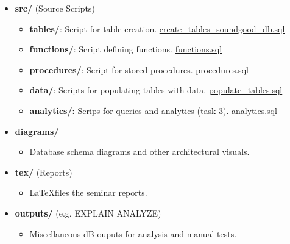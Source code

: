 \documentclass[a4paper]{scrartcl}
\begin{document}
\begin{itemize}
    \item \textbf{src/} (Source Scripts)
    \begin{itemize}
        \item \textbf{tables/}: Script for table creation.
        \href{https://github.com/VincentFerrigan/kth-iv1351-data-storage-paradigms/blob/main/src/tables/create_tables_soundgood_db.sql}{create\_tables\_soundgood\_db.sql}
        \item \textbf{functions/}: Script defining functions.
        \href{https://github.com/VincentFerrigan/kth-iv1351-data-storage-paradigms/blob/main/src/functions/functions.sql}{functions.sql}
        \item \textbf{procedures/}: Script for stored procedures.
        \href{https://github.com/VincentFerrigan/kth-iv1351-data-storage-paradigms/blob/main/src/procedures/procedures.sql}{procedures.sql}
        \item \textbf{data/}: Scripts for populating tables with data.
        \href{https://github.com/VincentFerrigan/kth-iv1351-data-storage-paradigms/blob/main/src/data/populate_tables.sql}{populate\_tables.sql}
        \item \textbf{analytics/:} Scrips for queries and analytics (task 3).
        \href{https://github.com/VincentFerrigan/kth-iv1351-data-storage-paradigms/blob/main/src/analytics/analytics.sql}{analytics.sql}
    \end{itemize}

    \item \textbf{diagrams/}
    \begin{itemize}
        \item Database schema diagrams and other architectural visuals.
    \end{itemize}

    \item \textbf{tex/} (Reports)
    \begin{itemize}
        \item \LaTeX files the seminar reports.
    \end{itemize}

    \item \textbf{outputs/} (e.g. EXPLAIN ANALYZE)
    \begin{itemize}
        \item Miscellaneous dB ouputs for analysis and manual tests.
    \end{itemize}

\end{itemize}
\end{document}
